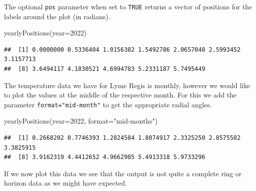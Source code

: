 \documentclass[
]{book}
\newenvironment{Shaded}{\begin{snugshade}}{\end{snugshade}}
\newcommand{\AttributeTok}[1]{\textcolor[rgb]{0.77,0.63,0.00}{#1}}
\newcommand{\DecValTok}[1]{\textcolor[rgb]{0.00,0.00,0.81}{#1}}
\newcommand{\FunctionTok}[1]{\textcolor[rgb]{0.00,0.00,0.00}{#1}}
\newcommand{\NormalTok}[1]{#1}
\newcommand{\StringTok}[1]{\textcolor[rgb]{0.31,0.60,0.02}{#1}}
\begin{document}
The optional \texttt{pos} parameter when set to \texttt{TRUE} returns a vector of positions for the labels around the plot (in radians).

\begin{Shaded}
\begin{Highlighting}[]
\FunctionTok{yearlyPositions}\NormalTok{(}\AttributeTok{year=}\DecValTok{2022}\NormalTok{)}
\end{Highlighting}
\end{Shaded}

\begin{verbatim}
##  [1] 0.0000000 0.5336404 1.0156382 1.5492786 2.0657048 2.5993452 3.1157713
##  [8] 3.6494117 4.1830521 4.6994783 5.2331187 5.7495449
\end{verbatim}

The temperature data we have for Lyme Regis is monthly, however we would like to plot the values at the middle of the respective month. For this we add the parameter \texttt{format="mid-month"} to get the appropriate radial angles.

\begin{Shaded}
\begin{Highlighting}[]
\FunctionTok{yearlyPositions}\NormalTok{(}\AttributeTok{year=}\DecValTok{2022}\NormalTok{, }\AttributeTok{format=}\StringTok{"mid{-}months"}\NormalTok{)}
\end{Highlighting}
\end{Shaded}

\begin{verbatim}
##  [1] 0.2668202 0.7746393 1.2824584 1.8074917 2.3325250 2.8575582 3.3825915
##  [8] 3.9162319 4.4412652 4.9662985 5.4913318 5.9733296
\end{verbatim}

If we now plot this data we see that the output is not quite a complete ring or horizon data as we might have expected.
\end{document}
